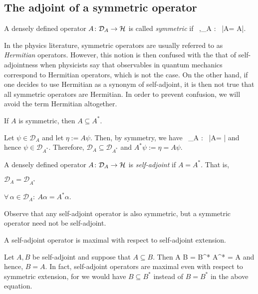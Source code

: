 \subsection{The adjoint of a symmetric operator}


\bd
A densely defined operator $A\colon\mathcal{D}_A\to\mathcal{H}$ is called \emph{symmetric} if
\bse
\forall \, \alpha,\beta \in {}_A : \ \langle\alpha|A\beta\rangle = \langle A\alpha|\beta\rangle.
\ese
\ed

\br
In the physics literature, symmetric operators are usually referred to as \emph{Hermitian} operators. However, this notion is then confused with the that of self-adjointness when physicists say that observables in quantum mechanics correspond to Hermitian operators, which is not the case. On the other hand, if one decides to use Hermitian as a synonym of self-adjoint, it is then not true that all symmetric operators are Hermitian. In order to prevent confusion, we will avoid the term Hermitian altogether. 
\er

\bp
\label{prp:symext}
If $A$ is symmetric, then $A\subseteq A^*$.
\ep

\bq
Let $\psi\in\mathcal{D}_A$ and let $\eta:=A\psi$. Then, by symmetry, we have
\bse
\forall \, \alpha\in {}_A : \ \langle\psi|A\alpha\rangle = \langle \eta|\alpha\rangle
\ese
and hence $\psi\in\mathcal{D}_{A^*}$. Therefore, $\mathcal{D}_A\subseteq \mathcal{D}_{A^*}$ and $A^*\psi:=\eta = A\psi$.
\eq

\bd
A densely defined operator $A\colon\mathcal{D}_A\to\mathcal{H}$ is \emph{self-adjoint} if $A=A^*$. That is,
\ben[label=(\roman*)]
\item $\mathcal{D}_A = \mathcal{D}_{A^*}$
\item $\forall \, \alpha \in \mathcal{D}_A : \ A\alpha = A^*\alpha$.
\een
\ed

\br
Observe that any self-adjoint operator is also symmetric, but a symmetric operator need not be self-adjoint. 
\er

\bc
\label{cor:selfasdjext}
A self-adjoint operator is maximal with respect to self-adjoint extension.
\ec

\bq
Let $A,B$ be self-adjoint and suppose that $A\subseteq B$. Then
\bse
A \subseteq B = B^* \subseteq A^* = A
\ese
and hence, $B=A$.
\eq
In fact, self-adjoint operators are maximal even with respect to symmetric extension, for we would have $B\subseteq B^*$ instead of $B=B^*$ in the above equation. 

